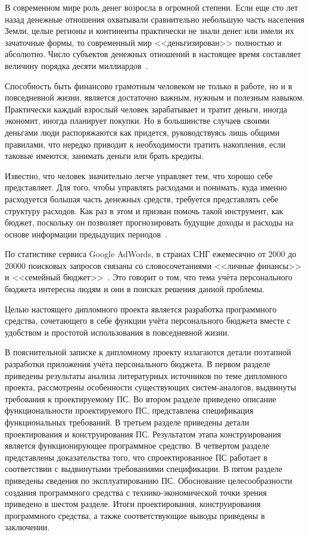 \label{sec:introduction}

В современном мире роль денег возросла в огромной степени.
Если еще сто лет назад денежные отношения охватывали сравнительно небольшую часть населения Земли, целые регионы и континенты практически не знали денег или имели их зачаточные формы, то современный мир <<деньгизирован>> полностью и абсолютно.
Число субъектов денежных отношений в настоящее время составляет величину порядка десяти миллиардов~\cite{money_egorov}.

Способность быть финансово грамотным человеком не только в работе, но и в повседневной жизни, является достаточно важным, нужным и полезным навыком.
Практически каждый взрослый человек зарабатывает и тратит деньги, иногда экономит, иногда планирует покупки.
Но в большинстве случаев своими деньгами люди распоряжаются как придется, руководствуясь лишь общими правилами, что нередко приводит к необходимости тратить накопления, если таковые имеются, занимать деньги или брать кредиты.

Известно, что человек значительно легче управляет тем, что хорошо себе представляет.
Для того, чтобы управлять расходами и понимать, куда именно расходуется большая часть денежных средств, требуется представлять себе структуру расходов.
Как раз в этом и призван помочь такой инструмент, как бюджет, поскольку он позволяет прогнозировать будущие доходы и расходы на основе информации предыдущих периодов~\cite{money_under_control}.

По статистике сервиса Google AdWords, в странах СНГ ежемесячно от 2000 до 20000 поисковых запросов связаны со словосочетаниями <<личные финансы>> и <<семейный бюджет>>~\cite{google_adwords}.
Это говорит о том, что тема учёта персонального бюджета интересна людям и они в поисках решения данной проблемы.

Целью настоящего дипломного проекта является разработка программного средства, сочетающего в себе функции учёта персонального бюджета вместе с удобством и простотой использования в повседневной жизни.

В пояснительной записке к дипломному проекту излагаются детали поэтапной разработки приложения учёта персонального бюджета.
В первом разделе приведены результаты анализа литературных источников по теме дипломного проекта, рассмотрены особенности существующих систем-аналогов, выдвинуты требования к проектируемому ПС.
Во втором разделе приведено описание функциональности проектируемого ПС, представлена спецификация функциональных требований.
В третьем разделе приведены детали проектирования и конструирования ПС.
Результатом этапа конструирования является функционирующее программное средство.
В четвертом разделе представлены доказательства того, что спроектированное ПС работает в соответствии с выдвинутыми требованиями спецификации.
В пятом разделе приведены сведения по эксплуатированию ПС.
Обоснование целесообразности создания программного средства с технико-экономической точки зрения приведено в шестом разделе.
Итоги проектирования, конструирования программного средства, а также соответствующие выводы приведены в заключении.

